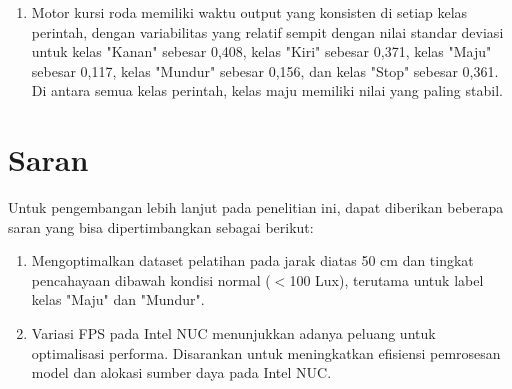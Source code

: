 \begin{enumerate}[nolistsep]
  \item Motor kursi roda memiliki waktu output yang konsisten di setiap kelas perintah, dengan variabilitas yang relatif sempit dengan nilai standar deviasi untuk kelas "Kanan" sebesar 0,408, kelas "Kiri" sebesar 0,371, kelas "Maju" sebesar 0,117, kelas "Mundur" sebesar 0,156, dan kelas "Stop" sebesar 0,361. Di antara semua kelas perintah, kelas maju memiliki nilai yang paling stabil.

\end{enumerate}

\section{Saran}
\label{chap:saran}

Untuk pengembangan lebih lanjut pada penelitian ini, dapat diberikan beberapa saran yang bisa dipertimbangkan sebagai berikut:

\begin{enumerate}[nolistsep]

  \item Mengoptimalkan dataset pelatihan pada jarak diatas 50 cm dan tingkat pencahayaan dibawah kondisi normal ($<$100 Lux), terutama untuk label kelas "Maju" dan "Mundur".
  
  \item Variasi FPS pada Intel NUC menunjukkan adanya peluang untuk optimalisasi performa. Disarankan untuk meningkatkan efisiensi pemrosesan model dan alokasi sumber daya pada Intel NUC.

\end{enumerate} 